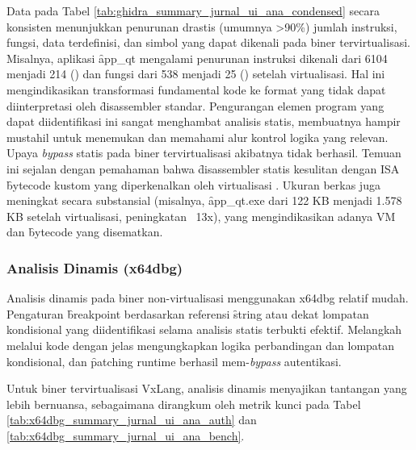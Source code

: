 Data pada Tabel \ref{tab:ghidra_summary_jurnal_ui_ana_condensed} secara konsisten menunjukkan penurunan drastis (umumnya >90\%) jumlah instruksi, fungsi, data terdefinisi, dan simbol yang dapat dikenali pada biner tervirtualisasi. Misalnya, aplikasi \f{app\_qt} mengalami penurunan instruksi dikenali dari 6104 menjadi 214 () dan fungsi dari 538 menjadi 25 () setelah virtualisasi. Hal ini mengindikasikan transformasi fundamental kode ke format yang tidak dapat diinterpretasi oleh \f{disassembler} standar. Pengurangan elemen program yang dapat diidentifikasi ini sangat menghambat analisis statis, membuatnya hampir mustahil untuk menemukan dan memahami alur kontrol logika yang relevan. Upaya \textit{bypass} statis pada biner tervirtualisasi akibatnya tidak berhasil. Temuan ini sejalan dengan pemahaman bahwa \f{disassembler} statis kesulitan dengan ISA \f{bytecode} kustom yang diperkenalkan oleh virtualisasi \cite{Sikorski2012, Eilam2011, Ko2007}. Ukuran berkas juga meningkat secara substansial (misalnya, \f{app\_qt.exe} dari 122 KB menjadi 1.578 KB setelah virtualisasi, peningkatan ~13x), yang mengindikasikan adanya VM dan \f{bytecode} yang disematkan.

\subsubsection{Analisis Dinamis (x64dbg)}
Analisis dinamis pada biner non-virtualisasi menggunakan x64dbg relatif mudah. Pengaturan \f{breakpoint} berdasarkan referensi \f{string} atau dekat lompatan kondisional yang diidentifikasi selama analisis statis terbukti efektif. Melangkah melalui kode dengan jelas mengungkapkan logika perbandingan dan lompatan kondisional, dan \f{patching runtime} berhasil mem-\textit{bypass} autentikasi.

Untuk biner tervirtualisasi VxLang, analisis dinamis menyajikan tantangan yang lebih bernuansa, sebagaimana dirangkum oleh metrik kunci pada Tabel \ref{tab:x64dbg_summary_jurnal_ui_ana_auth} dan \ref{tab:x64dbg_summary_jurnal_ui_ana_bench}.

